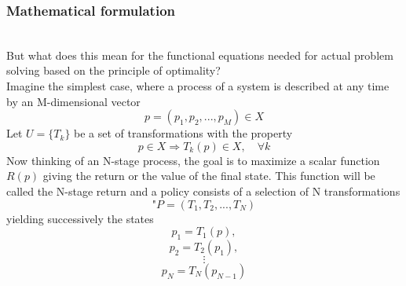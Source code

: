 \documentclass[conference]{IEEEtran}
\begin{document}
\subsubsection{Mathematical formulation} 
\quad \\
But what does this mean for the functional equations needed for actual problem solving based on the principle of optimality?
\\
Imagine the simplest case, where a process of a system is described at any time by an M-dimensional vector
\begin{equation}
p = (p_1, p_2, ..., p_M) \in X
\end{equation}
Let $U = \{T_k\}$ be a set of transformations with the property
\begin{equation}
p \in X \Rightarrow T_k(p) \in X, \quad \forall k
\end{equation}
Now thinking of an N-stage process, the goal is to maximize a scalar function $R(p)$ giving the return or the value of the final state. This function will be called the N-stage return and a policy consists of a selection of N transformations 
\begin{equation}
\text{"}P = (T_1, T_2, ..., T_N)
\end{equation}
yielding successively the states
\begin{equation*}
p_1 = T_1(p),
\end{equation*}
\begin{equation*}
p_2 = T_2(p_1),
\end{equation*}
\begin{equation}
\vdots
\end{equation}
\begin{equation*}
p_N = T_N(p_{N-1}) 
\end{equation*}
\end{document}
